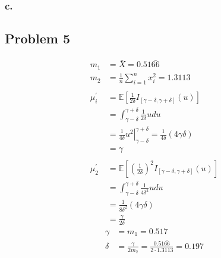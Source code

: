\documentclass{article}
\begin{document}
\subsubsection*{c.}

\subsection*{Problem 5}
\begin{align*}
m_1 &= \bar{X} = 0.51\bar{66} \\
m_2 &= \frac{1}{n}\sum^n_{i=1}x_i^2 = 1.3113 \\ \\
\mu_i^\prime &= \mathbb{E}\left[\frac{1}{2\delta}I_{[\gamma-\delta, \gamma+\delta]}(u)\right] \\ 
&= \int^{\gamma+\delta}_{\gamma-\delta}\frac{1}{2\delta}udu \\
&=\frac{1}{4\delta}\left.u^2\right|^{\gamma+\delta}_{\gamma-\delta} = \frac{1}{4\delta}\left(4\gamma\delta\right)\\
& = \gamma \\ \\
\mu_2^\prime &= \mathbb{E}\left[\left(\frac{1}{2\delta}\right)^2 I_{[\gamma-\delta, \gamma+\delta]}(u)\right] \\
&= \int^{\gamma+\delta}_{\gamma-\delta}\frac{1}{4\delta^2}udu \\
&= \frac{1}{8\delta^2}\left(4\gamma\delta\right) \\
&= \frac{\gamma}{2\delta}
\end{align*}
\begin{align*}
\gamma & = m_1 = 0.517 \\
\delta & = \frac{\gamma}{2m_2} = \frac{0.51\bar{66}}{2\cdot1.3113} = 0.197
\end{align*}
\end{document}
